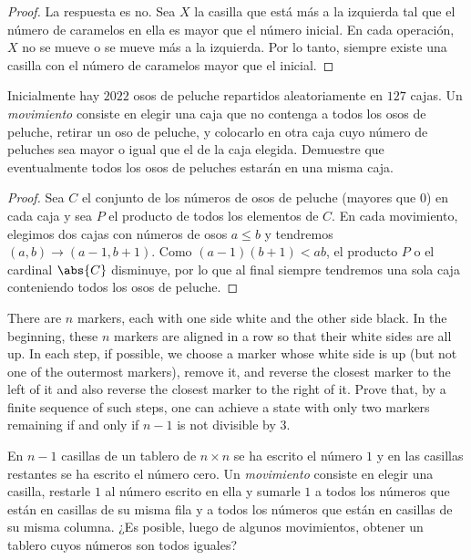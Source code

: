 \begin{proof}
	La respuesta es no. Sea $X$ la casilla que está más a la izquierda tal que el número de caramelos en ella es mayor que el número inicial. En cada operación, $X$ no se mueve o se mueve más a la izquierda. Por lo tanto, siempre existe una casilla con el número de caramelos mayor que el inicial.
\end{proof}

\begin{probEG}
	Inicialmente hay $2022$ osos de peluche repartidos aleatoriamente en $127$ cajas. Un \emph{movimiento} consiste en elegir una caja que no contenga a todos los osos de peluche, retirar un oso de peluche, y colocarlo en otra caja cuyo número de peluches sea mayor o igual que el de la caja elegida. Demuestre que eventualmente todos los osos de peluches estarán en una misma caja.
\end{probEG}

\begin{proof}
	Sea $C$ el conjunto de los números de osos de peluche (mayores que $0$) en cada caja y sea $P$ el producto de todos los elementos de $C$. En cada movimiento, elegimos dos cajas con números de osos $a\le b$ y tendremos $(a,b)\to(a-1,b+1)$. Como $(a-1)(b+1)<ab$, el producto $P$ o el cardinal $\abs{C}$ disminuye, por lo que al final siempre tendremos una sola caja conteniendo todos los osos de peluche.
\end{proof}

\begin{probMR}
	There are $n$ markers, each with one side white and the other side black. In the beginning, these $n$ markers are aligned in a row so that their white sides are all up. In each step, if possible, we choose a marker whose white side is up (but not one of the outermost markers), remove it, and reverse the closest marker to the left of it and also reverse the closest marker to the right of it. Prove that, by a finite sequence of such steps, one can achieve a state with only two markers remaining if and only if $n-1$ is not divisible by $3$.
\end{probMR}

\begin{probER}
	En $n-1$ casillas de un tablero de $n\times n$ se ha escrito el número $1$ y en las casillas restantes se ha escrito el número cero. Un \emph{movimiento} consiste en elegir una casilla, restarle $1$ al número escrito en ella y sumarle $1$ a todos los números que están en casillas de su misma fila y a todos los números que están en casillas de su misma columna. ¿Es posible, luego de algunos movimientos, obtener un tablero cuyos números son todos iguales?
\end{probER}

